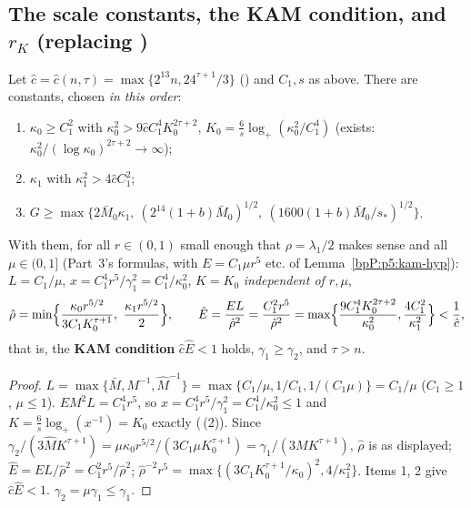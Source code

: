 \subsection{The scale constants, the KAM condition, and $r_K$ (replacing )}\label{bpP:p5:scales}

\begin{lemma}\label{bpP:p5:kam-cond}
Let $\hat c=\hat c(n,\tau)=\max\{2^{13}n,24^{\tau+1}/3\}$ () and $C_1,s$ as above. There are constants, chosen \emph{in this order}:
\begin{enumerate}
\item $\kappa_0\ge C_1^2$ with $\kappa_0^2>9\hat cC_1^4K_0^{2\tau+2}$, $K_0=\frac6s\log_+(\kappa_0^2/C_1^4)$ (exists: $\kappa_0^2/(\log\kappa_0)^{2\tau+2}\to\infty$);
\item $\kappa_1$ with $\kappa_1^2>4\hat cC_1^2$;
\item $G\ge\max\{2\bar M_0\kappa_1,\ (2^{14}(1+b)\bar M_0)^{1/2},\ (1600(1+b)\bar M_0/s_*)^{1/2}\}$.
\end{enumerate}
With them, for all $r\in(0,1)$ small enough that $\rho=\lambda_1/2$ makes sense and all $\mu\in(0,1]$ (Part~3's formulas, with $E=C_1\mu r^5$ etc. of Lemma~\ref{bpP:p5:kam-hyp}): $L=C_1/\mu$, $x=C_1^4r^5/\gamma_1^2=C_1^4/\kappa_0^2$, $K=K_0$ \emph{independent of $r,\mu$},
\[\hat\rho=\min\Bigl\{\frac{\kappa_0r^{5/2}}{3C_1K_0^{\tau+1}},\ \frac{\kappa_1r^{5/2}}{2}\Bigr\},\qquad\hat E=\frac{EL}{\hat\rho^2}=\frac{C_1^2r^5}{\hat\rho^2}=\max\Bigl\{\frac{9C_1^4K_0^{2\tau+2}}{\kappa_0^2},\frac{4C_1^2}{\kappa_1^2}\Bigr\}<\frac1{\hat c},\]
that is, the \textbf{KAM condition} $\hat c\hat E<1$ holds, $\gamma_1\ge\gamma_2$, and $\tau>n$.
\end{lemma}
\begin{proof}
\label{stepP:p5:kc-eval} $L=\max\{\bar M,M^{-1},\hat M^{-1}\}=\max\{C_1/\mu,1/C_1,1/(C_1\mu)\}=C_1/\mu$ ($C_1\ge1$, $\mu\le1$). $EM^2L=C_1^4r^5$, so $x=C_1^4r^5/\gamma_1^2=C_1^4/\kappa_0^2\le1$ and $K=\frac6s\log_+(x^{-1})=K_0$ exactly (\,(2)). Since $\gamma_2/(3\hat MK^{\tau+1})=\mu\kappa_0r^{5/2}/(3C_1\mu K_0^{\tau+1})=\gamma_1/(3MK^{\tau+1})$, $\hat\rho$ is as displayed; $\hat E=EL/\hat\rho^2=C_1^2r^5/\hat\rho^2$; $\hat\rho^{-2}r^5=\max\{(3C_1K_0^{\tau+1}/\kappa_0)^2,4/\kappa_1^2\}$.
\label{stepP:p5:kc-small} Items 1, 2 give $\hat c\hat E<1$. $\gamma_2=\mu\gamma_1\le\gamma_1$.
\end{proof}

